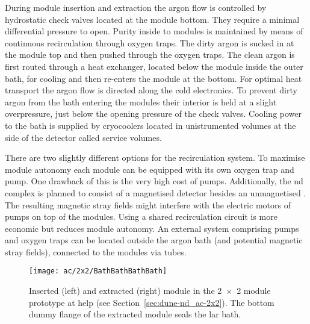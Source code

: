 During module insertion and extraction the argon flow is controlled by hydrostatic check valves located at the module bottom.
They require a minimal differential pressure to open.
Purity inside to modules is maintained by means of continuous \lar{} recirculation through oxygen traps.
The dirty argon is sucked in at the module top and then pushed through the oxygen traps.
The clean argon is first routed through a heat exchanger, located below the module inside the outer bath, for cooling and then re-enters the module at the bottom.
For optimal heat transport the argon flow is directed along the cold electronics.
To prevent dirty argon from the bath entering the modules their interior is held at a slight overpressure, just below the opening pressure of the check valves.
Cooling power to the bath is supplied by cryocoolers located in unistrumented volumes at the side of the detector called service volumes.

There are two slightly different options for the recirculation system.
To maximise module autonomy each module can be equipped with its own oxygen trap and \lar{} pump.
One drawback of this is the very high cost of \lar{} pumps.
Additionally, the \dune{} \gls{nd} complex is planned to consist of a magnetised detector besides an unmagnetised \lartpc{}.
The resulting magnetic stray fields might interfere with the electric motors of \lar{} pumps on top of the modules.
Using a shared recirculation circuit is more economic but reduces module autonomy.
An external system comprising pumps and oxygen traps can be located outside the argon bath (and potential magnetic stray fields), connected to the modules via tubes.

\begin{figure}[tbp]
	\centering
	\texttt{[image: ac/2x2/BathBathBathBath]}
	\caption[\AC{} module insertion and extraction]{%
		Inserted (left) and extracted (right) \AC{} module in the \num{2 x 2} module prototype at \acrshort{help} (see Section~\ref{sec:dune-nd_ac-2x2}).
		The bottom dummy flange of the extracted module seals the \acrshort{lar} bath.
	}
	\label{fig:ac_module-ins-ext}
\end{figure}

